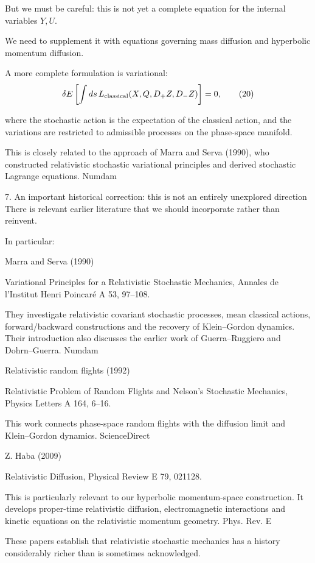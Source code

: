 But we must be careful: this is not yet a complete equation for the internal variables \(Y,U\).

We need to supplement it with equations governing mass diffusion and hyperbolic momentum diffusion.

A more complete formulation is variational:
\[
\delta E\left[
\int ds\,
L_{\rm classical}(X,Q,D_+Z,D_-Z)
\right]=0,
\tag{20}
\]

where the stochastic action is the expectation of the classical action, and the variations are restricted to admissible processes on the phase-space manifold.

This is closely related to the approach of Marra and Serva (1990), who constructed relativistic stochastic variational principles and derived stochastic Lagrange equations. 
Numdam


7. An important historical correction: this is not an entirely unexplored direction
There is relevant earlier literature that we should incorporate rather than reinvent.

In particular:

Marra and Serva (1990)

Variational Principles for a Relativistic Stochastic Mechanics, Annales de l'Institut Henri Poincaré A 53, 97–108.

They investigate relativistic covariant stochastic processes, mean classical actions, forward/backward constructions and the recovery of Klein–Gordon dynamics. Their introduction also discusses the earlier work of Guerra–Ruggiero and Dohrn–Guerra. 
Numdam


Relativistic random flights (1992)

Relativistic Problem of Random Flights and Nelson's Stochastic Mechanics, Physics Letters A 164, 6–16.

This work connects phase-space random flights with the diffusion limit and Klein–Gordon dynamics. 
ScienceDirect


Z. Haba (2009)

Relativistic Diffusion, Physical Review E 79, 021128.

This is particularly relevant to our hyperbolic momentum-space construction. It develops proper-time relativistic diffusion, electromagnetic interactions and kinetic equations on the relativistic momentum geometry. 
Phys. Rev. E


These papers establish that relativistic stochastic mechanics has a history considerably richer than is sometimes acknowledged.


